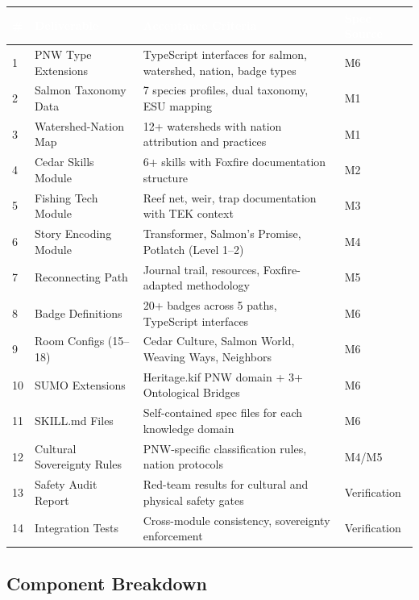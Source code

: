 \documentclass[11pt,letterpaper]{article}
\newcommand{\tableheader}[1]{\textbf{\sffamily\textcolor{white}{#1}}}
\begin{document}
\begin{center}
\begin{tabularx}{\textwidth}{C{0.5cm}L{3cm}XL{2cm}}
\toprule
{}
\tableheader{\#} & \tableheader{Deliverable} & \tableheader{Acceptance Criteria} & \tableheader{Spec Source} \\
 & PNW Type Extensions & TypeScript interfaces for salmon, watershed, nation, badge types & M6 \\
2 & Salmon Taxonomy Data & 7 species profiles, dual taxonomy, ESU mapping & M1 \\
3 & Watershed-Nation Map & 12+ watersheds with nation attribution and practices & M1 \\
4 & Cedar Skills Module & 6+ skills with Foxfire documentation structure & M2 \\
5 & Fishing Tech Module & Reef net, weir, trap documentation with TEK context & M3 \\
6 & Story Encoding Module & Transformer, Salmon's Promise, Potlatch (Level 1--2) & M4 \\
7 & Reconnecting Path & Journal trail, resources, Foxfire-adapted methodology & M5 \\
8 & Badge Definitions & 20+ badges across 5 paths, TypeScript interfaces & M6 \\
9 & Room Configs (15--18) & Cedar Culture, Salmon World, Weaving Ways, Neighbors & M6 \\
10 & SUMO Extensions & Heritage.kif PNW domain + 3+ Ontological Bridges & M6 \\
11 & SKILL.md Files & Self-contained spec files for each knowledge domain & M6 \\
12 & Cultural Sovereignty Rules & PNW-specific classification rules, nation protocols & M4/M5 \\
13 & Safety Audit Report & Red-team results for cultural and physical safety gates & Verification \\
14 & Integration Tests & Cross-module consistency, sovereignty enforcement & Verification \\
\bottomrule
\end{tabularx}
\end{center}

\subsection{Component Breakdown}
\end{document}
